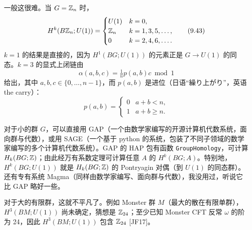 一般这很难。当 $G=\mathbb{Z}_n$ 时，
\begin{equation}
  H^k(B\mathbb{Z}_n;U(1))=
  \begin{cases}
    U(1) & k=0,\\
    \mathbb{Z}_n & k=1,3,5,\dots,\\
    0 & k=2,4,6,\dots.
  \end{cases}
  \tag{9.43}
\end{equation}
$k=1$ 的结果是直接的，因为 $H^1(BG;U(1))$ 的元素正是 $G\to U(1)$ 的同态。$k=3$ 的显式上闭链由
\begin{equation}
  \alpha(a,b,c)=\tfrac1n p(a,b)c \bmod 1
  \tag{9.44}
\end{equation}
给出，其中 $a,b,c\in\{0,\dots,n-1\}$，而 $p(a,b)$ 是进位（日语“繰り上がり”，英语 the carry）：
\begin{equation}
  p(a,b)=
  \begin{cases}
    0 & a+b<n,\\
    1 & a+b\ge n.
  \end{cases}
  \tag{9.45}
\end{equation}

对于小的群 $G$，可以直接用 GAP（一个由数学家编写的开源计算机代数系统，面向群与代数），或用 SAGE（一个基于 python 的系统，包装了不同子领域的数学家编写的多个计算机代数系统）。GAP 的 HAP 包有函数 \texttt{GroupHomology}，可计算 $H_k(BG;\mathbb{Z})$；由此经万有系数定理可计算任意 $A$ 的 $H^k(BG;A)$。特别地，$H^k(BG;U(1))$ 就是 $H_k(BG;\mathbb{Z})$ 的 Pontryagin 对偶（到 $U(1)$ 的同态群）。还有专有系统 Magma（同样由数学家编写、面向群与代数），我没用过，听说它比 GAP 略好一些。

对于大的有限群，这就不平凡了。例如 Monster 群 $M$（最大的散在有限单群），$H^3(BM;U(1))$ 尚未确定，猜想是 $\mathbb{Z}_{24}$；至少已知 Monster CFT 反常 $\omega$ 的阶为 24，因此 $H^3(BM;U(1))$ 包含 $\mathbb{Z}_{24}$ [JF17]。


